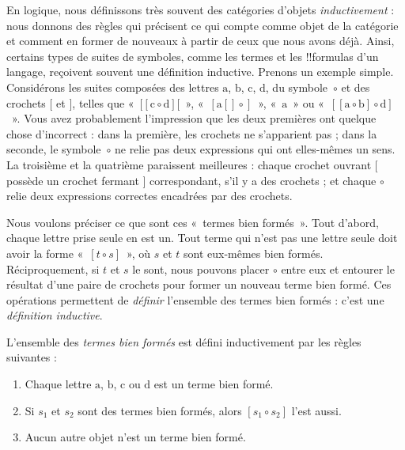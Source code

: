 \documentclass[../../../include/open-logic-section]{subfiles}
\begin{document}


En logique, nous définissons
très souvent des catégories
d'objets \emph{inductivement} :
nous donnons des règles qui
précisent ce qui compte
comme objet de la catégorie
et comment en former de
nouveaux à partir de ceux
que nous avons déjà.
Ainsi, certains types
de suites de symboles,
comme les termes et
les !!{formula}s d'un
langage, reçoivent
souvent une définition
inductive. Prenons
un exemple simple.
Considérons les suites
composées des lettres
$\mathrm{a}$, $\mathrm{b}$,
$\mathrm{c}$, $\mathrm{d}$,
du symbole~$\circ$
et des crochets $[$ et
$]$, telles que
«~$[[\mathrm{c} \circ \mathrm{d}][$~»,
«~$[\mathrm{a}[]\circ]$~»,
«~$\mathrm{a}$~» ou
«~$[[\mathrm{a} \circ \mathrm{b}]
\circ \mathrm{d}]$~».
Vous avez probablement
l'impression que les
deux premières ont
quelque chose d'incorrect :
dans la première,
les crochets ne
s'apparient pas ;
dans la seconde,
le symbole~$\circ$
ne relie pas deux
expressions qui ont
elles-mêmes un sens.
La troisième et la
quatrième paraissent
meilleures : chaque
crochet ouvrant $[$
possède un crochet
fermant $]$ correspondant,
s'il y a des crochets ;
et chaque $\circ$
relie deux expressions
correctes encadrées
par des crochets.

Nous voulons préciser
ce que sont ces
«~termes bien formés~».
Tout d'abord,
chaque lettre
prise seule
en est un.
Tout terme qui
n'est pas une
lettre seule
doit avoir la
forme
«~$[t \circ s]$~»,
où $s$ et $t$
sont eux-mêmes
bien formés.
Réciproquement,
si $t$ et $s$
le sont, nous
pouvons placer
$\circ$ entre
eux et entourer
le résultat
d'une paire
de crochets
pour former
un nouveau
terme bien
formé.
Ces opérations
permettent de
\emph{définir}
l'ensemble des
termes bien
formés : c'est
une \emph{définition
inductive}.

\begin{defn}
  L'ensemble des
  \emph{termes bien formés}
  est défini inductivement
  par les règles suivantes :
  \begin{enumerate}
  \item Chaque lettre
    $\mathrm{a}$, $\mathrm{b}$,
    $\mathrm{c}$ ou $\mathrm{d}$
    est un terme bien formé.
  \item Si $s_1$ et $s_2$
    sont des termes bien
    formés, alors
    $[s_1 \circ s_2]$
    l'est aussi.
  \item Aucun autre objet
    n'est un terme
    bien formé.
  \end{enumerate}
\end{defn}
\end{document}
